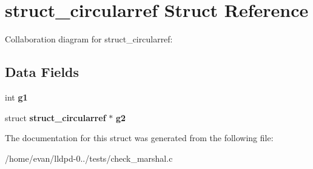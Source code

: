 \section{struct\-\_\-circularref \-Struct \-Reference}
\label{structstruct__circularref}


\-Collaboration diagram for struct\-\_\-circularref\-:
\subsection*{\-Data \-Fields}
\begin{DoxyCompactItemize}
\item 
int {\bfseries g1}\label{structstruct__circularref_aead879afa7fa89459f13a2b03e81ad15}

\item 
struct {\bf struct\-\_\-circularref} $\ast$ {\bfseries g2}\label{structstruct__circularref_af755b6ac7e6a63a643339d80d2e3a86d}

\end{DoxyCompactItemize}


\-The documentation for this struct was generated from the following file\-:\begin{DoxyCompactItemize}
\item 
/home/evan/lldpd-\/0../tests/check\-\_\-marshal.\-c\end{DoxyCompactItemize}
